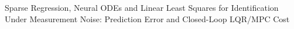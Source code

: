 Sparse Regression, Neural ODEs and Linear Least Squares for Identification Under Measurement Noise: Prediction Error and Closed-Loop LQR/MPC Cost
